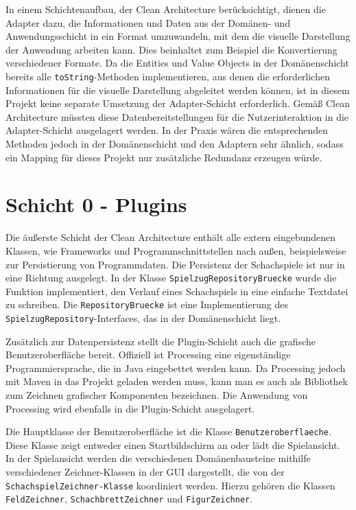 In einem Schichtenaufbau, der Clean Architecture berücksichtigt, dienen die Adapter dazu, die Informationen und Daten aus der Domänen- und Anwendungsschicht in ein Format umzuwandeln, mit dem die visuelle Darstellung der Anwendung arbeiten kann. 
Dies beinhaltet zum Beispiel die Konvertierung verschiedener Formate. 
Da die Entities und Value Objects in der Domänenschicht bereits alle \texttt{toString}-Methoden implementieren, aus denen die erforderlichen Informationen für die visuelle Darstellung abgeleitet werden können, ist in diesem Projekt keine separate Umsetzung der Adapter-Schicht erforderlich. 
Gemäß Clean Architecture müssten diese Datenbereitstellungen für die Nutzerinteraktion in die Adapter-Schicht ausgelagert werden. 
In der Praxis wären die entsprechenden Methoden jedoch in der Domänenschicht und den Adaptern sehr ähnlich, sodass ein Mapping für dieses Projekt nur zusätzliche Redundanz erzeugen würde.

\section{Schicht 0 - Plugins}

Die äußerste Schicht der Clean Architecture enthält alle extern eingebundenen Klassen, wie Frameworks und Programmschnittstellen nach außen, beispielsweise zur Persistierung von Programmdaten. 
Die Persistenz der Schachspiele ist nur in eine Richtung ausgelegt. 
In der Klasse \texttt{SpielzugRepositoryBruecke} wurde die Funktion implementiert, den Verlauf eines Schachspiels in eine einfache Textdatei zu schreiben. 
Die \texttt{RepositoryBruecke} ist eine Implementierung des \texttt{SpielzugRepository}-Interfaces, das in der Domänenschicht liegt.

Zusätzlich zur Datenpersistenz stellt die Plugin-Schicht auch die grafische Benutzeroberfläche bereit. 
Offiziell ist Processing eine eigenständige Programmiersprache, die in Java eingebettet werden kann. 
Da Processing jedoch mit Maven in das Projekt geladen werden muss, kann man es auch als \glqq Bibliothek zum Zeichnen grafischer Komponenten\grqq{} bezeichnen. 
Die Anwendung von Processing wird ebenfalls in die Plugin-Schicht ausgelagert.

Die Hauptklasse der Benutzeroberfläche ist die Klasse \texttt{Benutzeroberflaeche}.
Diese Klasse zeigt entweder einen Startbildschirm an oder lädt die Spielansicht.
In der Spielansicht werden die verschiedenen Domänenbausteine mithilfe verschiedener Zeichner-Klassen in der GUI dargestellt, die von der \texttt{SchachspielZeichner-Klasse} koordiniert werden. 
Hierzu gehören die Klassen \texttt{FeldZeichner}, \texttt{SchachbrettZeichner} und \texttt{FigurZeichner}.

